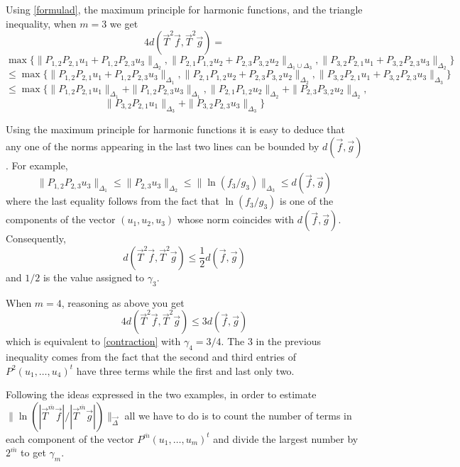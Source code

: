 \documentclass{amsart}
\numberwithin{equation}{section}
\theoremstyle{definition}
\begin{document}
Using \eqref{formulad}, the maximum principle for harmonic functions, and the triangle inequality, when $m=3$ we get
\[ 4d( \vec{T}^2\vec{f}, \vec{T}^2 \vec{g} ) =\]
\[ \max \{\|P_{1,2}P_{2,1} u_1 + P_{1,2}P_{2,3}u_3\|_{\Delta_2},
\|P_{2,1}P_{1,2} u_2 + P_{2,3}P_{3,2} u_2\|_{\Delta_1 \cup \Delta_3},
 \|P_{3,2}P_{2,1} u_1 + P_{3,2}P_{2,3} u_3\|_{\Delta_2}\}
\]
\[\leq  \max \{\|P_{1,2}P_{2,1} u_1 + P_{1,2}P_{2,3}u_3\|_{\Delta_1},
\|P_{2,1}P_{1,2} u_2 + P_{2,3}P_{3,2} u_2\|_{\Delta_2},
 \|P_{3,2}P_{2,1} u_1 + P_{3,2}P_{2,3} u_3\|_{\Delta_3}\}
\]
\[\leq  \max \{\|P_{1,2}P_{2,1} u_1\|_{\Delta_1} + \|P_{1,2}P_{2,3}u_3\|_{\Delta_1},
\|P_{2,1}P_{1,2} u_2\|_{\Delta_2} + \|P_{2,3}P_{3,2} u_2\|_{\Delta_2},
\]
\[
 \|P_{3,2}P_{2,1} u_1\|_{\Delta_3} + \|P_{3,2}P_{2,3} u_3\|_{\Delta_3}\}
\]

Using the maximum principle for harmonic functions it is easy to deduce that any one of the norms appearing in the last two lines can be bounded by $d(\vec{f},\vec{g})$. For example,
\[
  \|P_{1,2}P_{2,3}u_3\|_{\Delta_1} \leq \|P_{2,3}u_3\|_{\Delta_2} \leq \|\ln (f_3/g_3)\|_{\Delta_3} \leq d(\vec{f},\vec{g})
\]
where the last equality follows from the fact that $\ln (f_3/g_3)$ is one of the components of the vector $(u_1,u_2,u_3)$ whose norm coincides with $d(\vec{f},\vec{g})$. Consequently,
\[ d( \vec{T}^2\vec{f}, \vec{T}^2 \vec{g} ) \leq \frac{1}{2} d(\vec{f},\vec{g})
\]
and $1/2$  is the value assigned to $\gamma_3$.

When $m=4$, reasoning as above you get
\[ 4d( \vec{T}^2\vec{f}, \vec{T}^2 \vec{g} ) \leq 3 d(\vec{f},\vec{g})
\]
which is equivalent to \eqref{contraction} with $\gamma_4 = 3/4$. The $3$ in the previous inequality comes from the fact that the second and third entries of $P^2(u_1,\ldots,u_4)^t$ have three terms while the first and last only two.

Following the ideas expressed in the two examples, in order to estimate $\| \ln (|\vec{T}^{\overline{m}} \vec{f}|/|\vec{T}^{\overline{m}} \vec{g}| )\|_{\vec{\Delta}}$ all we have to do is to count the number of terms in each component of the vector $P^{\overline{m}}(u_1,\ldots,u_m)^t $ and divide the largest number by $2^{\overline{m}}$ to get $\gamma_m$.
\end{document}
